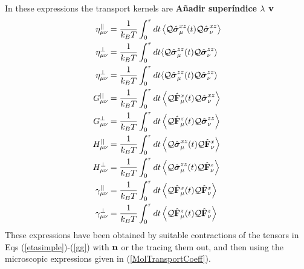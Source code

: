 \documentclass[b5paper,openright,11pt]{book}
\newcommand{\Note}[1]{{\bf \color{red}#1}}    %
\begin{document}
In these expressions the transport kernels are
\Note{Añadir superíndice $\lambda$ ${\bf v}$ }
\begin{align}
\eta^{||}_{\mu\nu}&
=\frac{1}{k_BT}\int_0^\tau  dt\left\langle 
{\cal Q}\hat{\boldsymbol{\sigma}}^{xz}_\mu(t){\cal Q}\hat{\boldsymbol{\sigma}}^{xz}_\nu
\right\rangle
\nonumber\\
\eta^{\bot}_{\mu\nu}&
= \frac{1}{k_BT}\int_0^\tau  dt\langle 
{\cal Q}\hat{\boldsymbol{\sigma}}^{zz}_\mu(t)
{\cal Q}\hat{\boldsymbol{\sigma}}^{zz}_\nu\rangle
\nonumber\\
\eta^{\bot}_{\mu\nu}&
= \frac{1}{k_BT}\int_0^\tau  dt\langle 
{\cal Q}\hat{\boldsymbol{\sigma}}^{zz}_\mu(t)
{\cal Q}\hat{\boldsymbol{\sigma}}^{zz}_\nu\rangle
\nonumber\\
G^{||}_{\mu\nu}&
=\frac{1}{k_BT} \int_0^\tau  dt
\left\langle{\cal Q}\hat{\bf F}^{x}_\mu(t)
{\cal Q}\hat{\boldsymbol{\sigma}}^{xz}_\nu
\right\rangle
\nonumber\\
G^{\bot}_{\mu\nu}&=\frac{1}{k_BT} \int_0^\tau  dt
\left\langle {\cal Q}\hat{\bf F}^{z}_\mu(t)
{\cal Q}\hat{\boldsymbol{\sigma}}^{zz}_\nu
\right\rangle
\nonumber\\
H^{||}_{\mu\nu}&
=\frac{1}{k_BT} 
\int_0^\tau  dt
\left\langle{\cal Q}\hat{\boldsymbol{\sigma}}^{xz}_\mu(t){\cal Q}\hat{\bf F}^{x}_\nu\right\rangle
\nonumber\\
H^\bot_{\mu\nu}&=\frac{1}{k_BT} 
\int_0^\tau  dt\left\langle {\cal Q}\hat{\boldsymbol{\sigma}}^{zz}_\mu(t){\cal Q}\hat{\bf F}^{z}_\nu\right\rangle
\nonumber\\
\gamma^{||}_{\mu\nu}&=
\frac{1}{k_BT} \int_0^\tau  dt
\left\langle 
{\cal Q}\hat{\bf F}^{x}_\mu(t)
{\cal Q}\hat{\bf F}^{x}_\nu\right\rangle
\nonumber\\
\gamma^{\bot}_{\mu\nu}&=
\frac{1}{k_BT} \int_0^\tau  dt\left\langle 
{\cal Q}\hat{\bf F}^{z}_\mu(t){\cal Q}\hat{\bf F}^{z}_\nu
\right\rangle
\label{summary_munu}
\end{align}
These expressions have  been obtained by suitable  contractions of the
tensors  in Eqs  (\ref{etasimple})-(\ref{gg})  with ${\bf  n}$ or  the
tracing them out, and then  using the microscopic expressions given in
(\ref{MolTransportCoeff}).
\end{document}
